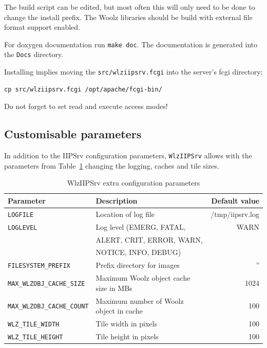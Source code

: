 \documentclass[11pt]{article}
\begin{document}
The build script can be edited, but most often this will only
need to be done to change the install prefix.
The Woolz libraries should be build with external file format support
enabled.

For doxygen documentation run \texttt{make doc}.
The documentation is generated into the \texttt{Docs} directory.

Installing implies moving the \texttt{src/wlziipsrv.fcgi} into the server's
fcgi directory:
\begin{verbatim}
cp src/wlziipsrv.fcgi /opt/apache/fcgi-bin/
\end{verbatim}
Do not forget to set read and execute access modes!

\subsection{Customisable parameters}
\label{sec:custom_param}
In addition to the IIPSrv \cite[p.25]{IIPSRV097} configuration parameters,
\texttt{WlzIIPSrv} allows with the  parameters from
Table~\ref{tab:parameters} changing the logging, caches and tile sizes.

\begin{table}[!htbp]
\centering
\begin{tabular}{|l|p{}|r|}
\hline
\textbf{Parameter}          & \textbf{Description}                        & \textbf{Default value} \\
\hline
\texttt{LOGFILE}                         & Location of log file                                 & /tmp/iipsrv.log \\
\texttt{LOGLEVEL}                        & Log level (EMERG, FATAL,                             & WARN \\
                                         & ALERT, CRIT, ERROR, WARN,                            & \\
					 & NOTICE, INFO, DEBUG)                                 & \\
\texttt{FILESYSTEM\_PREFIX}              & Prefix directory for images                          & '' \\
\texttt{MAX\_WLZOBJ\_CACHE\_SIZE}        & Maximum Woolz object cache size in MBs               & 1024 \\
\texttt{MAX\_WLZOBJ\_CACHE\_COUNT}	 & Maximum number of Woolz object in cache		& 100 \\
\texttt{WLZ\_TILE\_WIDTH}                & Tile width in pixels                                 & 100  \\
\texttt{WLZ\_TILE\_HEIGHT}               & Tile height in pixels                                & 100  \\
\hline
\end{tabular}
\caption{WlzIIPSrv extra configuration parameters}
\label{tab:parameters}
\end{table}
\end{document}
